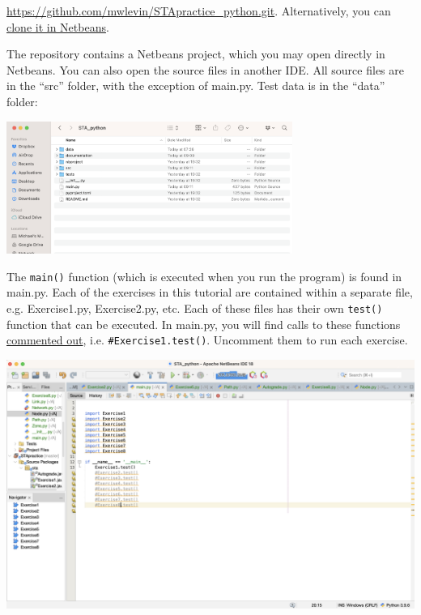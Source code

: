 \documentclass[11pt]{article}
\begin{document}
\noindent \href{https://github.com/mwlevin/STApractice_python.git}{https://github.com/mwlevin/STApractice\_python.git}. Alternatively, you can \href{https://netbeans.org/kb/docs/ide/git.html#clone}{clone it in Netbeans}.


The repository contains a Netbeans project, which you may open directly in Netbeans. You can also open the source files in another IDE. All source files are in the ``src'' folder, with the exception of main.py. Test data is in the ``data'' folder:

\begin{center}
	\includegraphics[width=0.7\textwidth]{folder.png}
\end{center}

The \texttt{main()} function (which is executed when you run the program) is found in main.py. Each of the exercises in this tutorial are contained within a separate file, e.g. Exercise1.py, Exercise2.py, etc. Each of these files has their own \texttt{test()} function that can be executed.
In main.py, you will find calls to these functions \href{https://www.w3schools.com/python/python_comments.asp}{commented out}, i.e. \texttt{\#Exercise1.test()}. Uncomment them to run each exercise. 

\begin{center}
	\includegraphics[width=\textwidth]{netbeans1.png}
\end{center}
\end{document}
